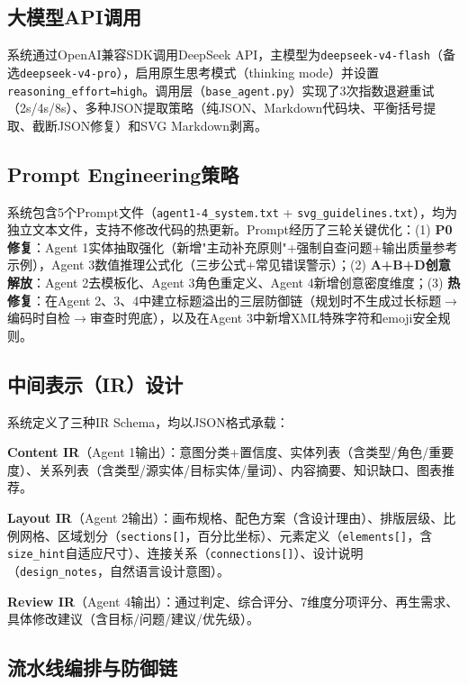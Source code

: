 \documentclass[11pt,a4paper]{article}
\begin{document}
\subsection{大模型API调用}

系统通过OpenAI兼容SDK调用DeepSeek API\cite{deepseek}，主模型为\texttt{deepseek-v4-flash}（备选\texttt{deepseek-v4-pro}），启用原生思考模式（thinking mode）并设置\texttt{reasoning\_effort=high}。调用层（\texttt{base\_agent.py}）实现了3次指数退避重试（2s/4s/8s）、多种JSON提取策略（纯JSON、Markdown代码块、平衡括号提取、截断JSON修复）和SVG Markdown剥离。

\subsection{Prompt Engineering策略}

系统包含5个Prompt文件（\texttt{agent1-4\_system.txt} + \texttt{svg\_guidelines.txt}），均为独立文本文件，支持不修改代码的热更新。Prompt经历了三轮关键优化：(1) \textbf{P0修复}：Agent 1实体抽取强化（新增"主动补充原则"+强制自查问题+输出质量参考示例），Agent 3数值推理公式化（三步公式+常见错误警示）；(2) \textbf{A+B+D创意解放}：Agent 2去模板化、Agent 3角色重定义、Agent 4新增创意密度维度；(3) \textbf{热修复}：在Agent 2、3、4中建立标题溢出的三层防御链（规划时不生成过长标题$\rightarrow$编码时自检$\rightarrow$审查时兜底），以及在Agent 3中新增XML特殊字符和emoji安全规则。

\subsection{中间表示（IR）设计}

系统定义了三种IR Schema，均以JSON格式承载：

\noindent\textbf{Content IR}（Agent 1输出）：意图分类+置信度、实体列表（含类型/角色/重要度）、关系列表（含类型/源实体/目标实体/量词）、内容摘要、知识缺口、图表推荐。

\noindent\textbf{Layout IR}（Agent 2输出）：画布规格、配色方案（含设计理由）、排版层级、比例网格、区域划分（\texttt{sections[]}，百分比坐标）、元素定义（\texttt{elements[]}，含\texttt{size\_hint}自适应尺寸）、连接关系（\texttt{connections[]}）、设计说明（\texttt{design\_notes}，自然语言设计意图）。

\noindent\textbf{Review IR}（Agent 4输出）：通过判定、综合评分、7维度分项评分、再生需求、具体修改建议（含目标/问题/建议/优先级）。

\subsection{流水线编排与防御链}
\end{document}
